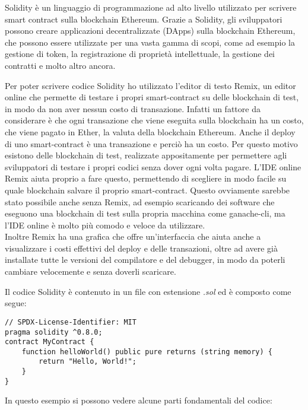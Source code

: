 Solidity è un linguaggio di programmazione ad alto livello utilizzato per
scrivere smart contract sulla blockchain Ethereum. Grazie a Solidity, gli
sviluppatori possono creare applicazioni decentralizzate (DApps) sulla
blockchain Ethereum, che possono essere utilizzate per una vasta gamma di
scopi, come ad esempio la gestione di token, la registrazione di proprietà
intellettuale, la gestione dei contratti e molto altro ancora.

Per poter scrivere codice Solidity ho utilizzato l'editor di testo Remix, 
un editor online che permette di testare i propri smart-contract su delle 
blockchain di test, in modo da non aver nessun costo di transazione.
Infatti un fattore da considerare è che ogni transazione che viene eseguita
sulla blockchain ha un costo, che viene pagato in Ether, la valuta della
blockchain Ethereum. Anche il deploy di uno smart-contract è una transazione
e perciò ha un costo. Per questo motivo esistono delle blockchain di test,
realizzate appositamente per permettere agli sviluppatori di testare i propri
codici senza dover ogni volta pagare. L'IDE online Remix aiuta proprio a fare
questo, permettendo di scegliere in modo facile su quale blockchain salvare
il proprio smart-contract. Questo ovviamente sarebbe stato possibile anche
senza Remix, ad esempio scaricando dei software che eseguono
una blockchain di test sulla propria macchina come ganache-cli, ma l'IDE
online è molto più comodo e veloce da utilizzare. \\
Inoltre Remix ha una grafica che offre un'interfaccia che aiuta anche a 
visualizzare i costi effettivi del deploy e delle transazioni, oltre ad avere
già installate tutte le versioni del compilatore e del debugger, in modo 
da poterli cambiare velocemente e senza doverli scaricare.

\newpage

Il codice Solidity è contenuto in un file con estensione \textit{.sol} ed
è composto come segue:
\begin{lstlisting}[language=Solidity]
// SPDX-License-Identifier: MIT
pragma solidity ^0.8.0;
contract MyContract {
    function helloWorld() public pure returns (string memory) {
        return "Hello, World!";
    }
}
\end{lstlisting}
In questo esempio si possono vedere alcune parti fondamentali del codice:

